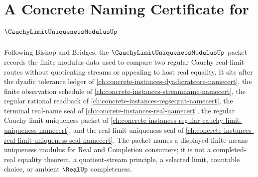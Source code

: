 \chapter{A Concrete Naming Certificate for $\CauchyLimitUniquenessModulusUp$}
\label{ch:concrete-instances-cauchy-limit-uniqueness-modulus-namecert}

Following Bishop and Bridges, the $\CauchyLimitUniquenessModulusUp$ packet records the finite modulus data used to compare two regular Cauchy real-limit routes without quotienting streams or appealing to host real equality. It sits after the dyadic tolerance ledger of \autoref{ch:concrete-instances-dyadicratcore-namecert}, the finite observation schedule of \autoref{ch:concrete-instances-streamname-namecert}, the regular rational readback of \autoref{ch:concrete-instances-regseqrat-namecert}, the terminal real-name seal of \autoref{ch:concrete-instances-real-namecert}, the regular Cauchy limit uniqueness packet of \autoref{ch:concrete-instances-regular-cauchy-limit-uniqueness-namecert}, and the real-limit uniqueness seal of \autoref{ch:concrete-instances-real-limit-uniqueness-seal-namecert}. The packet names a displayed finite-means uniqueness modulus for Real and Completion consumers; it is not a completed-real equality theorem, a quotient-stream principle, a selected limit, countable choice, or ambient $\RealUp$ completeness.

